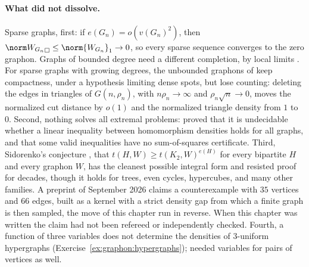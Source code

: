 \begin{refsection}
\paragraph{What did not dissolve.} Sparse graphs, first: if $e(G_n)=o(v(G_n)^2)$, then $\graphoncut{W_{G_n}}\le\norm{W_{G_n}}_1\to0$, so every sparse sequence converges to the zero graphon. Graphs of bounded degree need a different completion, by local limits \parencite[see][]{Lovasz2012}. For sparse graphs with growing degrees, the unbounded graphons of \textcite{BorgsChayesCohnZhao2019} keep compactness, under a hypothesis limiting dense spots, but lose counting: deleting the edges in triangles of $G(n,\rho_n)$, with $n\rho_n\to\infty$ and $\rho_n\sqrt n\to0$, moves the normalized cut distance by $o(1)$ and the normalized triangle density from $1$ to $0$. Second, nothing solves all extremal problems: \textcite{HatamiNorine2011} proved that it is undecidable whether a linear inequality between homomorphism densities holds for all graphs, and that some valid inequalities have no sum-of-squares certificate. Third, Sidorenko's conjecture \parencite{Sidorenko1993}, that $t(H,W)\ge t(K_2,W)^{e(H)}$ for every bipartite $H$ and every graphon $W$, has the cleanest possible integral form and resisted proof for decades, though it holds for trees, even cycles, hypercubes, and many other families. A preprint of September 2026 \parencite{OpenAI2026} claims a counterexample with $35$ vertices and $66$ edges, built as a kernel with a strict density gap from which a finite graph is then sampled, the move of this chapter run in reverse. When this chapter was written the claim had not been refereed or independently checked. Fourth, a function of three variables does not determine the densities of $3$-uniform hypergraphs (Exercise~\ref{ex:graphon:hypergraphs}); \textcite{ElekSzegedy2012} needed variables for pairs of vertices as well.


\end{refsection}
